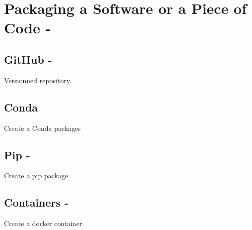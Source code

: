 \section{Packaging a Software or a Piece of Code - \faBoxOpen}
\subsection{GitHub - \faGithub }
Versionned repository.

\subsection{Conda}
Create a Conda packages

\subsection{Pip - \faPython}
Create a pip package.

\subsection{Containers - \faDocker}
Create a docker container.

